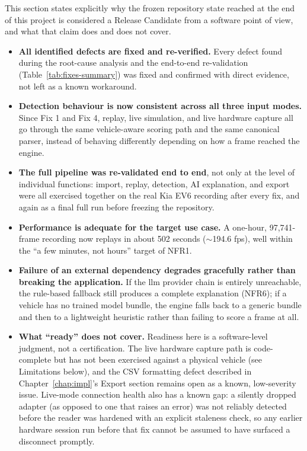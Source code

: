 This section states explicitly why the frozen repository state reached at the end of this project is considered a Release Candidate from a software point of view, and what that claim does and does not cover.

\begin{itemize}
    \item \textbf{All identified defects are fixed and re-verified.} Every defect found during the root-cause analysis and the end-to-end re-validation (Table~\ref{tab:fixes-summary}) was fixed and confirmed with direct evidence, not left as a known workaround.
    \item \textbf{Detection behaviour is now consistent across all three input modes.} Since Fix 1 and Fix 4, replay, live simulation, and live hardware capture all go through the same vehicle-aware scoring path and the same canonical parser, instead of behaving differently depending on how a frame reached the engine.
    \item \textbf{The full pipeline was re-validated end to end}, not only at the level of individual functions: import, replay, detection, AI explanation, and export were all exercised together on the real Kia EV6 recording after every fix, and again as a final full run before freezing the repository.
    \item \textbf{Performance is adequate for the target use case.} A one-hour, 97{,}741-frame recording now replays in about 502 seconds ($\sim$194.6 fps), well within the ``a few minutes, not hours'' target of NFR1.
    \item \textbf{Failure of an external dependency degrades gracefully rather than breaking the application.} If the \gls{llm} provider chain is entirely unreachable, the rule-based fallback still produces a complete explanation (NFR6); if a vehicle has no trained model bundle, the engine falls back to a generic bundle and then to a lightweight heuristic rather than failing to score a frame at all.
    \item \textbf{What ``ready'' does not cover.} Readiness here is a software-level judgment, not a certification. The live hardware capture path is code-complete but has not been exercised against a physical vehicle (see Limitations below), and the CSV formatting defect described in Chapter~\ref{chap:impl}'s Export section remains open as a known, low-severity issue. Live-mode connection health also has a known gap: a silently dropped adapter (as opposed to one that raises an error) was not reliably detected before the reader was hardened with an explicit staleness check, so any earlier hardware session run before that fix cannot be assumed to have surfaced a disconnect promptly.
\end{itemize}

